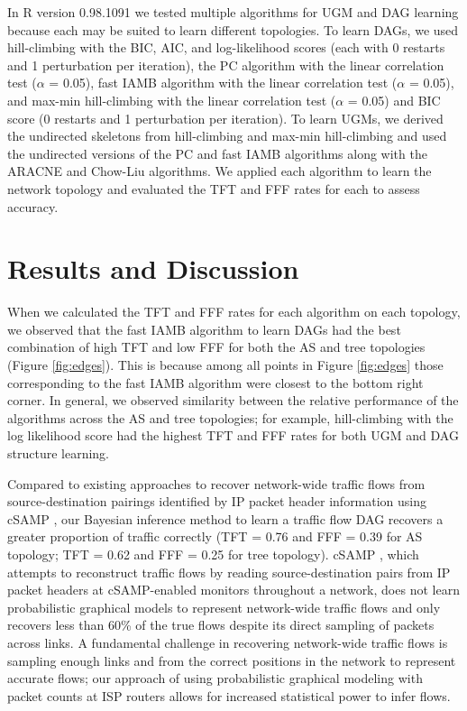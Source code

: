 \documentclass[conference]{IEEEtran}
\begin{document}
In R version 0.98.1091 \cite{b18} we tested multiple algorithms \cite{b10} for UGM and DAG learning because each may be suited to learn different topologies. To learn DAGs, we used hill-climbing with the BIC, AIC, and log-likelihood scores (each with 0 restarts and 1 perturbation per iteration), the PC algorithm with the linear correlation test ($\alpha$ = 0.05), fast IAMB algorithm with the linear correlation test ($\alpha$ = 0.05), and max-min hill-climbing with the linear correlation test ($\alpha$ = 0.05) and BIC score (0 restarts and 1 perturbation per iteration). To learn UGMs, we derived the undirected skeletons from hill-climbing and max-min hill-climbing and used the undirected versions of the PC and fast IAMB algorithms along with the ARACNE and Chow-Liu algorithms. We applied each algorithm to learn the network topology and evaluated the TFT and FFF rates for each to assess accuracy.

\section{Results and Discussion}

When we calculated the TFT and FFF rates for each algorithm on each topology, we observed that the fast IAMB algorithm to learn DAGs had the best combination of high TFT and low FFF for both the AS and tree topologies (Figure \ref{fig:edges}). This is because among all points in Figure \ref{fig:edges} those corresponding to the fast IAMB algorithm were closest to the bottom right corner. In general, we observed similarity between the relative performance of the algorithms across the AS and tree topologies; for example, hill-climbing with the log likelihood score had the highest TFT and FFF rates for both UGM and DAG structure learning.

Compared to existing approaches to recover network-wide traffic flows from source-destination pairings identified by IP packet header information using cSAMP \cite{b19}, our Bayesian inference method to learn a traffic flow DAG recovers a greater proportion of traffic correctly (TFT = 0.76 and FFF = 0.39 for AS topology; TFT = 0.62 and FFF = 0.25 for tree topology). cSAMP \cite{b19}, which attempts to reconstruct traffic flows by reading source-destination pairs from IP packet headers at cSAMP-enabled monitors throughout a network, does not learn probabilistic graphical models to represent network-wide traffic flows and only recovers less than 60\% of the true flows despite its direct sampling of packets across links. A fundamental challenge in recovering network-wide traffic flows is sampling enough links and from the correct positions in the network to represent accurate flows; our approach of using probabilistic graphical modeling with packet counts at ISP routers allows for increased statistical power to infer flows.
\end{document}
